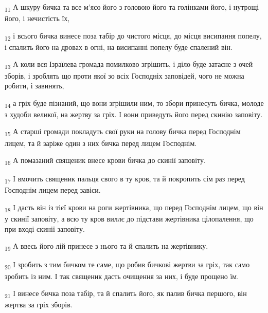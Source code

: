 \begin{tcolorbox}
\textsubscript{11} А шкуру бичка та все м'ясо його з головою його та голінками його, і нутрощі його, і нечистість їх,
\end{tcolorbox}
\begin{tcolorbox}
\textsubscript{12} і всього бичка винесе поза табір до чистого місця, до місця висипання попелу, і спалить його на дровах в огні, на висипанні попелу буде спалений він.
\end{tcolorbox}
\begin{tcolorbox}
\textsubscript{13} А коли вся Ізраїлева громада помилково згрішить, і діло буде затаєне з очей зборів, і зроблять що проти якої зо всіх Господніх заповідей, чого не можна робити, і завинять,
\end{tcolorbox}
\begin{tcolorbox}
\textsubscript{14} а гріх буде пізнаний, що вони згрішили ним, то збори принесуть бичка, молоде з худоби великої, на жертву за гріх. І вони приведуть його перед скинію заповіту.
\end{tcolorbox}
\begin{tcolorbox}
\textsubscript{15} А старші громади покладуть свої руки на голову бичка перед Господнім лицем, та й заріже один з них бичка перед лицем Господнім.
\end{tcolorbox}
\begin{tcolorbox}
\textsubscript{16} А помазаний священик внесе крови бичка до скинії заповіту.
\end{tcolorbox}
\begin{tcolorbox}
\textsubscript{17} І вмочить священик пальця свого в ту кров, та й покропить сім раз перед Господнім лицем перед завіси.
\end{tcolorbox}
\begin{tcolorbox}
\textsubscript{18} І дасть він із тієї крови на роги жертівника, що перед Господнім лицем, що він у скинії заповіту, а всю ту кров виллє до підстави жертівника цілопалення, що при вході скинії заповіту.
\end{tcolorbox}
\begin{tcolorbox}
\textsubscript{19} А ввесь його лій принесе з нього та й спалить на жертівнику.
\end{tcolorbox}
\begin{tcolorbox}
\textsubscript{20} І зробить з тим бичком те саме, що робив бичкові жертви за гріх, так само зробить із ним. І так священик дасть очищення за них, і буде прощено їм.
\end{tcolorbox}
\begin{tcolorbox}
\textsubscript{21} І винесе бичка поза табір, та й спалить його, як палив бичка першого, він жертва за гріх зборів.
\end{tcolorbox}
